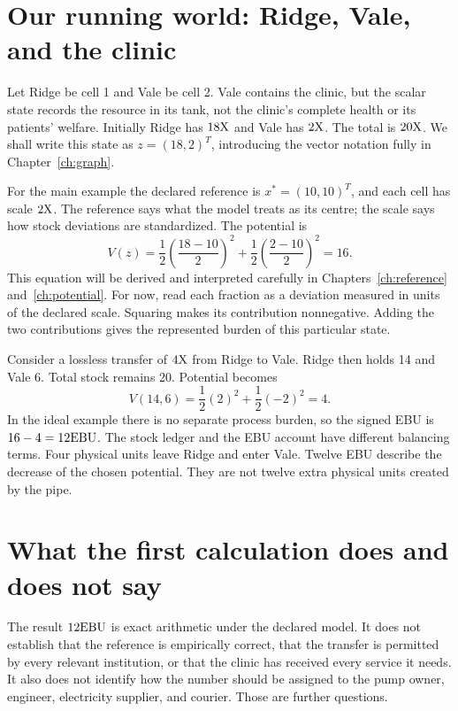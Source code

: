 \section{Our running world: Ridge, Vale, and the clinic}
Let Ridge be cell 1 and Vale be cell 2. Vale contains the clinic, but the scalar state records the resource in its tank, not the clinic's complete health or its patients' welfare. Initially Ridge has \(18\mathrm{X}\) and Vale has \(2\mathrm{X}\). The total is \(20\mathrm{X}\). We shall write this state as \(z=(18,2)^T\), introducing the vector notation fully in Chapter~\ref{ch:graph}.

For the main example the declared reference is \(x^*=(10,10)^T\), and each cell has scale \(2\mathrm{X}\). The reference says what the model treats as its centre; the scale says how stock deviations are standardized. The potential is
\begin{equation}
 V(z)=\frac12\left(\frac{18-10}{2}\right)^2+
       \frac12\left(\frac{2-10}{2}\right)^2=16.
\end{equation}
This equation will be derived and interpreted carefully in Chapters~\ref{ch:reference} and~\ref{ch:potential}. For now, read each fraction as a deviation measured in units of the declared scale. Squaring makes its contribution nonnegative. Adding the two contributions gives the represented burden of this particular state.

Consider a lossless transfer of \(4\mathrm{X}\) from Ridge to Vale. Ridge then holds 14 and Vale 6. Total stock remains 20. Potential becomes
\begin{equation}
 V(14,6)=\frac12(2)^2+\frac12(-2)^2=4.
\end{equation}
In the ideal example there is no separate process burden, so the signed EBU is \(16-4=12\mathrm{EBU}\). The stock ledger and the EBU account have different balancing terms. Four physical units leave Ridge and enter Vale. Twelve EBU describe the decrease of the chosen potential. They are not twelve extra physical units created by the pipe.


\section{What the first calculation does and does not say}
The result \(12\mathrm{EBU}\) is exact arithmetic under the declared model. It does not establish that the reference is empirically correct, that the transfer is permitted by every relevant institution, or that the clinic has received every service it needs. It also does not identify how the number should be assigned to the pump owner, engineer, electricity supplier, and courier. Those are further questions.

